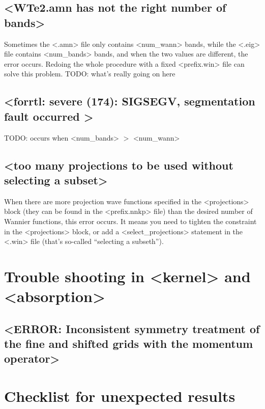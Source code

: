 \documentclass[hyperref, a4paper]{report}
\def\texttt#1{<#1>}%
\newcommand{\shortcode}[1]{\texttt{#1}}
\begin{document}
\subsection{\shortcode{WTe2.amn has not the right number of bands}}

Sometimes the \shortcode{.amn} file only contains 
\shortcode{num_wann} bands,
while the \shortcode{.eig} file contains \shortcode{num_bands} bands,
and when the two values are different,
the error occurs. 
Redoing the whole procedure with a fixed \shortcode{prefix.win} file 
can solve this problem.
TODO: what's really going on here

\subsection{\shortcode{forrtl: severe (174): SIGSEGV, segmentation fault occurred }}

TODO: occurs when \shortcode{num_bands} $>$ \shortcode{num_wann}

\subsection{\shortcode{too many projections to be used without selecting a subset}}

When there are more 
projection wave functions specified in the \shortcode{projections} block 
(they can be found in the \shortcode{prefix.nnkp} file)
than the desired number of Wannier functions,
this error occurs.
It means you need to tighten the constraint in the \shortcode{projections} block, 
or add a \shortcode{select_projections} statement in the \shortcode{.win} file
(that's so-called ``selecting a subseth'').

\section{Trouble shooting in \shortcode{kernel} and \shortcode{absorption}}

\subsection{\shortcode{ERROR: Inconsistent symmetry treatment of the fine and shifted grids with the momentum operator}}

\section{Checklist for unexpected results}
\end{document}
